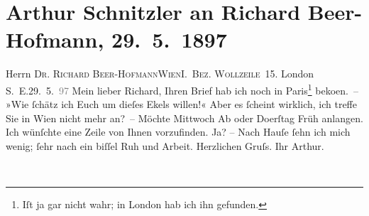 

         
         \renewcommand{\erwaehntePersonen}{Personen: Richard Beer-Hofmann}
         \renewcommand{\erwaehnteOrte}{Orte: Forest Hill, I., Innere Stadt, London, Paris, Wien, Wollzeile, Österreich}
         \renewcommand{\erwaehnteWerke}{}
               \section[Arthur Schnitzler an Richard Beer-Hofmann, 29. 5. 1897]{ Arthur Schnitzler an Richard Beer-Hofmann, 29. 5. 1897}\nopagebreak{}\rehead{ }\begin{ledgroupsized}[t]{13cm}\normalsize\beginnumbering \toendnotes[C]{\smallbreak\pagebreak[2]} 
\pstart{}{\pb}Herrn \textsc{Dr. Richard
                     Beer-Hofmann}\pend{}\pstart{}\textsc{Wien}\pend{}\pstart{}\textsc{I. Bez. Wollzeile 15}.\pend{}{\bigskip}\pstart
           \raggedleft{}{\pb}London S. E.29. 5. \textcolor{gray}{97}\pend
           \pstart
           Mein lieber Richard, Ihren Brief hab ich noch in Paris\footnote{\noindent{}Iſt ja gar nicht wahr; in London hab ich
                     ihn gefunden.} beko{\geminationm}en. – »Wie ſchätz ich Euch um dieſes Ekels
               willen!«\pend
           \pstart
           Aber es ſcheint wirklich, ich treffe Sie in Wien
               nicht mehr an? – Möchte Mittwoch{ }\introOben{}Ab\introOben{} oder Do{\geminationn}erſtag{ }Früh anlangen. Ich wünſchte eine Zeile von Ihnen vorzufinden. Ja? – Nach
               Hauſe ſehn ich mich wenig; ſehr nach ein biſſel Ruh und Arbeit.\pend
           \pstart Herzlichen Gruſs. Ihr \spacefill\mbox{Arthur.}\pend{}
         
         \endnumbering{}\end{ledgroupsized}  \newcommand{\dateiname}{L00681}\newcommand{\titel}{Arthur Schnitzler an Richard Beer-Hofmann, 29. 5. 1897}\newcommand{\editorInnen}{Martin Anton Müller und Gerd-Hermann Susen}
      